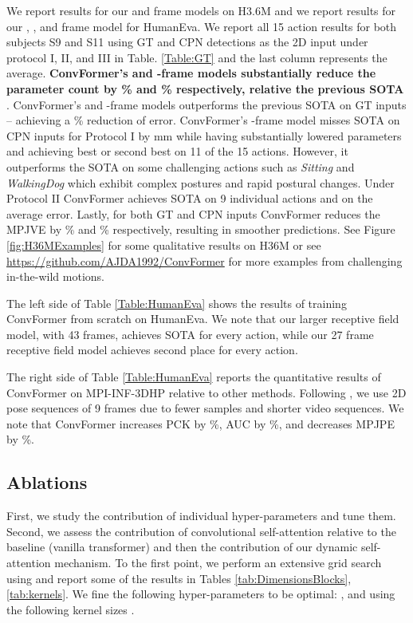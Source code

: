 \documentclass{article}
\begin{document}
We report results for our  and  frame models on H3.6M and we report results for our , , and  frame model for HumanEva. We report all 15 action results for both subjects S9 and S11 using GT and CPN detections as the 2D input under protocol I, II, and III in Table. \ref{Table:GT} and the last column represents the average. \textbf{ConvFormer's  and -frame models substantially reduce the parameter count by \textbf{\%} and \textbf{\%} respectively, relative the previous SOTA} \cite{li2022mhformer}. ConvFormer's  and -frame models outperforms the previous SOTA on GT inputs -- achieving a \% reduction of error. ConvFormer's -frame model misses SOTA on CPN inputs for Protocol I by mm while having substantially lowered parameters and achieving best or second best on 11 of the 15 actions. However, it outperforms the SOTA on some challenging actions such as \textit{Sitting} and \textit{WalkingDog} which exhibit complex postures and rapid postural changes.   Under Protocol II ConvFormer achieves SOTA on 9 individual actions and on the average error. Lastly, for both GT and CPN inputs ConvFormer reduces the MPJVE by \% and \% respectively, resulting in smoother predictions. See Figure \ref{fig:H36MExamples} for some qualitative results on H36M or see \url{https://github.com/AJDA1992/ConvFormer} for more examples from challenging in-the-wild motions. 


The left side of Table \ref{Table:HumanEva} shows the results of training ConvFormer from scratch on HumanEva. We note that our larger receptive field model, with 43 frames, achieves SOTA for every action, while our  27 frame receptive field model achieves second place for every action. 


The right side of Table \ref{Table:HumanEva} reports the quantitative results of ConvFormer on MPI-INF-3DHP relative to other methods. Following \cite{ZZMYCD21,li2022mhformer}, we use 2D pose sequences of 9 frames due to fewer samples and shorter video sequences. We note that ConvFormer increases PCK by \%, AUC by \%, and decreases MPJPE by \%. 


\subsection{Ablations}
First, we study the contribution of individual hyper-parameters and tune them. Second, we assess the contribution of convolutional self-attention relative to the baseline (vanilla transformer) and then the contribution of our dynamic self-attention mechanism. To the first point, we perform an extensive grid search using \cite{liaw2018tune} and report some of the results in Tables \ref{tab:DimensionsBlocks}, \ref{tab:kernels}. We fine the following hyper-parameters to be optimal: ,  and using the following kernel sizes . 
\end{document}
